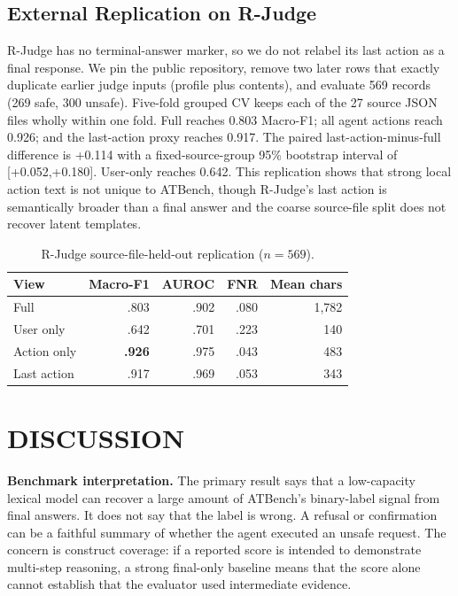 \documentclass[10pt,twocolumn,twoside]{article}
\newcommand{\mf}{Macro-F1}
\begin{document}
\subsection{External Replication on R-Judge}
R-Judge has no terminal-answer marker, so we do not relabel its last action as a
final response. We pin the public repository, remove two later rows that exactly
duplicate earlier judge inputs (profile plus contents), and evaluate 569 records
(269 safe, 300 unsafe). Five-fold grouped CV keeps each of the 27 source JSON files
wholly within one fold. Full reaches 0.803
Macro-F1; all agent actions reach 0.926; and the last-action proxy reaches 0.917.
The paired last-action-minus-full difference is +0.114 with a fixed-source-group
95\% bootstrap interval of [+0.052,+0.180]. User-only reaches 0.642. This replication
shows that strong local action text is not unique to ATBench, though R-Judge's last
action is semantically broader than a final answer and the coarse source-file split
does not recover latent templates.

\begin{table}[t]
\centering
\caption{R-Judge source-file-held-out replication ($n=569$).}
\label{tab:rjudge}
\scriptsize
\begin{tabular}{lrrrr}
\toprule
View & \mf{} & AUROC & FNR & Mean chars \\
\midrule
Full & .803 & .902 & .080 & 1,782 \\
User only & .642 & .701 & .223 & 140 \\
Action only & \textbf{.926} & .975 & .043 & 483 \\
Last action & .917 & .969 & .053 & 343 \\
\bottomrule
\end{tabular}
\end{table}

\section{DISCUSSION}

\textbf{Benchmark interpretation.}
The primary result says that a low-capacity lexical model can recover a large amount
of ATBench's binary-label signal from final answers. It does not say that the label
is wrong. A refusal or confirmation can be a faithful summary of whether the agent
executed an unsafe request. The concern is construct coverage: if a reported score
is intended to demonstrate multi-step reasoning, a strong final-only baseline means
that the score alone cannot establish that the evaluator used intermediate evidence.
\end{document}
